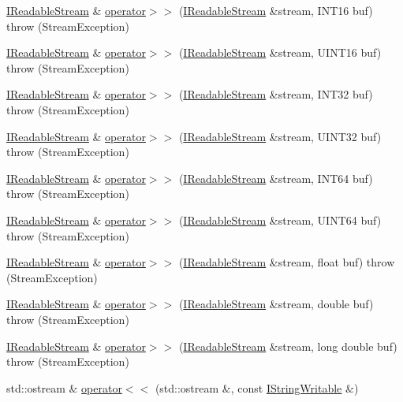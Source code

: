 \begin{DoxyCompactItemize}
\item 
\hyperlink{classsinsy_1_1IReadableStream}{\-I\-Readable\-Stream} \& \hyperlink{namespacesinsy_a000418995f4d0f3d37c09167a559d45f}{operator$>$$>$} (\hyperlink{classsinsy_1_1IReadableStream}{\-I\-Readable\-Stream} \&stream, \-I\-N\-T16 buf)  throw (\-Stream\-Exception)
\item 
\hyperlink{classsinsy_1_1IReadableStream}{\-I\-Readable\-Stream} \& \hyperlink{namespacesinsy_ae5298278b6dcc60541fadb6f2181c5bd}{operator$>$$>$} (\hyperlink{classsinsy_1_1IReadableStream}{\-I\-Readable\-Stream} \&stream, \-U\-I\-N\-T16 buf)  throw (\-Stream\-Exception)
\item 
\hyperlink{classsinsy_1_1IReadableStream}{\-I\-Readable\-Stream} \& \hyperlink{namespacesinsy_a64368ce4871b6360d47d28cc4ea267d3}{operator$>$$>$} (\hyperlink{classsinsy_1_1IReadableStream}{\-I\-Readable\-Stream} \&stream, \-I\-N\-T32 buf)  throw (\-Stream\-Exception)
\item 
\hyperlink{classsinsy_1_1IReadableStream}{\-I\-Readable\-Stream} \& \hyperlink{namespacesinsy_a3a6037e3b8cb1f954ec409a83d457c99}{operator$>$$>$} (\hyperlink{classsinsy_1_1IReadableStream}{\-I\-Readable\-Stream} \&stream, \-U\-I\-N\-T32 buf)  throw (\-Stream\-Exception)
\item 
\hyperlink{classsinsy_1_1IReadableStream}{\-I\-Readable\-Stream} \& \hyperlink{namespacesinsy_a3967b7fc7488f4f229230fbfe1cee8c7}{operator$>$$>$} (\hyperlink{classsinsy_1_1IReadableStream}{\-I\-Readable\-Stream} \&stream, \-I\-N\-T64 buf)  throw (\-Stream\-Exception)
\item 
\hyperlink{classsinsy_1_1IReadableStream}{\-I\-Readable\-Stream} \& \hyperlink{namespacesinsy_ae5f64e90c9bd9bc794318d7a3b3d69e1}{operator$>$$>$} (\hyperlink{classsinsy_1_1IReadableStream}{\-I\-Readable\-Stream} \&stream, \-U\-I\-N\-T64 buf)  throw (\-Stream\-Exception)
\item 
\hyperlink{classsinsy_1_1IReadableStream}{\-I\-Readable\-Stream} \& \hyperlink{namespacesinsy_af2f07b81b35e9f748f73440eaef7fd74}{operator$>$$>$} (\hyperlink{classsinsy_1_1IReadableStream}{\-I\-Readable\-Stream} \&stream, float buf)  throw (\-Stream\-Exception)
\item 
\hyperlink{classsinsy_1_1IReadableStream}{\-I\-Readable\-Stream} \& \hyperlink{namespacesinsy_af0c33a93d1871fec763ab44984980e9a}{operator$>$$>$} (\hyperlink{classsinsy_1_1IReadableStream}{\-I\-Readable\-Stream} \&stream, double buf)  throw (\-Stream\-Exception)
\item 
\hyperlink{classsinsy_1_1IReadableStream}{\-I\-Readable\-Stream} \& \hyperlink{namespacesinsy_adbf4eff4dada23c951b9c8931c148ad1}{operator$>$$>$} (\hyperlink{classsinsy_1_1IReadableStream}{\-I\-Readable\-Stream} \&stream, long double buf)  throw (\-Stream\-Exception)
\item 
\hypertarget{namespacesinsy_a0090d250ce949c22c7412acdecf67a3b}{std\-::ostream \& \hyperlink{namespacesinsy_a0090d250ce949c22c7412acdecf67a3b}{operator$<$$<$} (std\-::ostream \&, const \hyperlink{classsinsy_1_1IStringWritable}{\-I\-String\-Writable} \&)}\label{namespacesinsy_a0090d250ce949c22c7412acdecf67a3b}


\end{DoxyCompactItemize}
